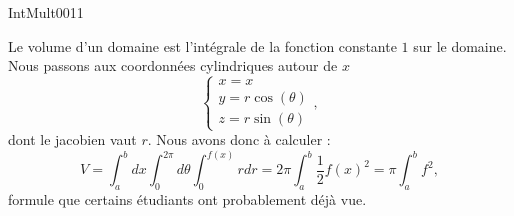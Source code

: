 
\begin{corrige}{IntMult0011}

	Le volume d'un domaine est l'intégrale de la fonction constante $1$ sur le domaine. Nous passons aux coordonnées cylindriques \og autour de $x$\fg
	\begin{equation}
		\left\{
		\begin{array}{ll}
			x=x\\
			y=r\cos(\theta)\\
			z=r\sin(\theta)
		\end{array}
		\right.,
	\end{equation}
	dont le jacobien vaut $r$. Nous avons donc à calculer :
	\begin{equation}
		V=\int_a^bdx\int_0^{2\pi}d\theta\int_0^{f(x)}rdr=2\pi\int_a^b\frac{1}{ 2 }f(x)^2=\pi\int_a^bf^2,
	\end{equation}
	formule que certains étudiants ont probablement déjà vue.

\end{corrige}

